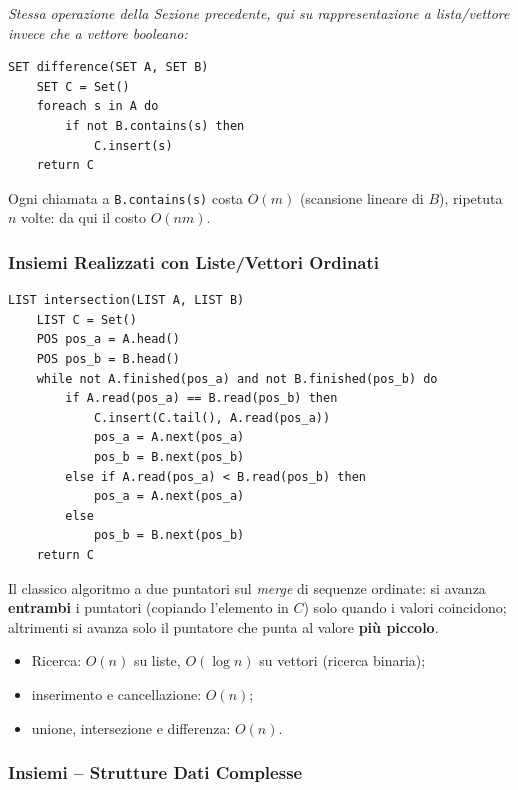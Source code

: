\documentclass[12pt, a4paper]{article}
\begin{document}
\textit{Stessa operazione della Sezione precedente, qui su rappresentazione a lista/vettore invece che a vettore booleano:}
\begin{verbatim}
SET difference(SET A, SET B)
    SET C = Set()
    foreach s in A do
        if not B.contains(s) then
            C.insert(s)
    return C
\end{verbatim}
Ogni chiamata a \texttt{B.contains(s)} costa $O(m)$ (scansione lineare di $B$), ripetuta $n$ volte: da qui il costo $O(nm)$.

\subsubsection{Insiemi Realizzati con Liste/Vettori Ordinati}

\begin{verbatim}
LIST intersection(LIST A, LIST B)
    LIST C = Set()
    POS pos_a = A.head()
    POS pos_b = B.head()
    while not A.finished(pos_a) and not B.finished(pos_b) do
        if A.read(pos_a) == B.read(pos_b) then
            C.insert(C.tail(), A.read(pos_a))
            pos_a = A.next(pos_a)
            pos_b = B.next(pos_b)
        else if A.read(pos_a) < B.read(pos_b) then
            pos_a = A.next(pos_a)
        else
            pos_b = B.next(pos_b)
    return C
\end{verbatim}
Il classico algoritmo a due puntatori sul \textit{merge} di sequenze ordinate: si avanza \textbf{entrambi} i puntatori (copiando l'elemento in $C$) solo quando i valori coincidono; altrimenti si avanza solo il puntatore che punta al valore \textbf{più piccolo}.

\begin{tcolorbox}[colback=lightergray!5, colframe=tocsubsec, title=\textbf{Costo Operazioni}]
\begin{itemize}
    \item Ricerca: $O(n)$ su liste, $O(\log n)$ su vettori (ricerca binaria);
    \item inserimento e cancellazione: $O(n)$;
    \item unione, intersezione e differenza: $O(n)$.
\end{itemize}
\end{tcolorbox}

\subsubsection{Insiemi -- Strutture Dati Complesse}
\end{document}
